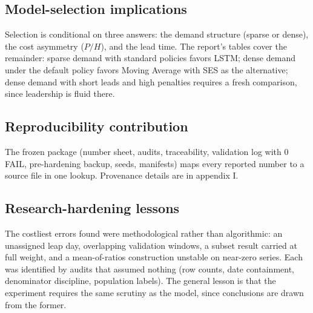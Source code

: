\subsection{Model-selection implications}
\label{sec:c-select}
Selection is conditional on three answers: the demand structure (sparse or
dense), the cost asymmetry ($P/H$), and the lead time. The report's tables
cover the remainder: sparse demand with standard policies favors LSTM; dense
demand under the default policy favors Moving Average with SES as the
alternative; dense demand with short leads and high penalties requires a
fresh comparison, since leadership is fluid there.

\subsection{Reproducibility contribution}
\label{sec:c-repro}
The frozen package (number sheet, audits, traceability, validation log with
0 FAIL, pre-hardening backup, seeds, manifests) maps every reported number
to a source file in one lookup. Provenance details are in appendix I.

\subsection{Research-hardening lessons}
\label{sec:c-harden}
The costliest errors found were methodological rather than algorithmic: an
unassigned leap day, overlapping validation windows, a subset result carried
at full weight, and a mean-of-ratios construction unstable on near-zero
series. Each was identified by audits that assumed nothing (row counts, date
containment, denominator discipline, population labels). The general lesson
is that the experiment requires the same scrutiny as the model, since
conclusions are drawn from the former.
